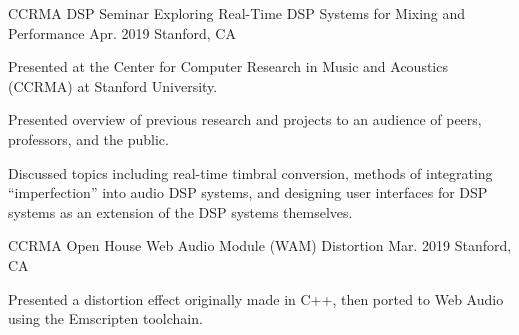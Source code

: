 \begin{cventries}
    \cventry
    {CCRMA DSP Seminar} %
    {Exploring Real-Time DSP Systems for Mixing and Performance} %
    {Apr. 2019} %
    {Stanford, CA} %
    {
      \begin{cvitems} %
        \item {Presented at the Center for Computer Research in Music and Acoustics (CCRMA) at Stanford University.}
        \item {Presented overview of previous research and projects to an audience of peers, professors, and the public.}
        \item {Discussed topics including real-time timbral conversion, methods of integrating ``imperfection'' into audio
               DSP systems, and designing user interfaces for DSP systems as an extension of the DSP systems themselves.}
      \end{cvitems}
    }

    \cventry
    {CCRMA Open House} %
    {Web Audio Module (WAM) Distortion} %
    {Mar. 2019} %
    {Stanford, CA} %
    {
      \begin{cvitems} %
        \item {Presented a distortion effect originally made in C++, then ported to Web Audio using the Emscripten toolchain.}
      \end{cvitems}
    }

\end{cventries}

